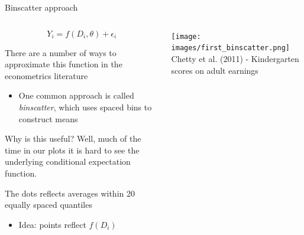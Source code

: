 \documentclass[notes,11pt, aspectratio=169]{beamer}
\newcommand\1{\operatorname{\mathbbm{1}}\indicatorfence}
\newenvironment{wideitemize}{\itemize\addtolength{\itemsep}{10pt}}{\enditemize}
\begin{document}
\begin{frame}{Binscatter approach}
  \begin{columns}[T] %
    \begin{column}{.5\textwidth}
      $$ Y_{i} = f(D_{i},\theta) + \epsilon_{i}$$
      \vspace{-10pt}
  \begin{wideitemize}
  \item There are a number of ways to approximate this function in the econometrics literature
    \begin{itemize}
    \item One common approach is called \emph{binscatter}, which uses
      spaced bins to construct means
    \end{itemize}
  \item Why is this useful? Well, much of the time in our plots it is
    hard to see the underlying conditional expectation function.
  \item The dots reflects averages within 20 equally spaced quantiles
    \begin{itemize}
    \item Idea: points reflect $f(D_{i})$
    \end{itemize}
  \end{wideitemize}
  \end{column}%
  \hfill%
  \begin{column}{.5\textwidth}
\texttt{[image: images/first\_binscatter.png]}
Chetty et al. (2011) - Kindergarten scores on adult earnings
  \end{column}
\end{columns}
\end{frame}
\end{document}
